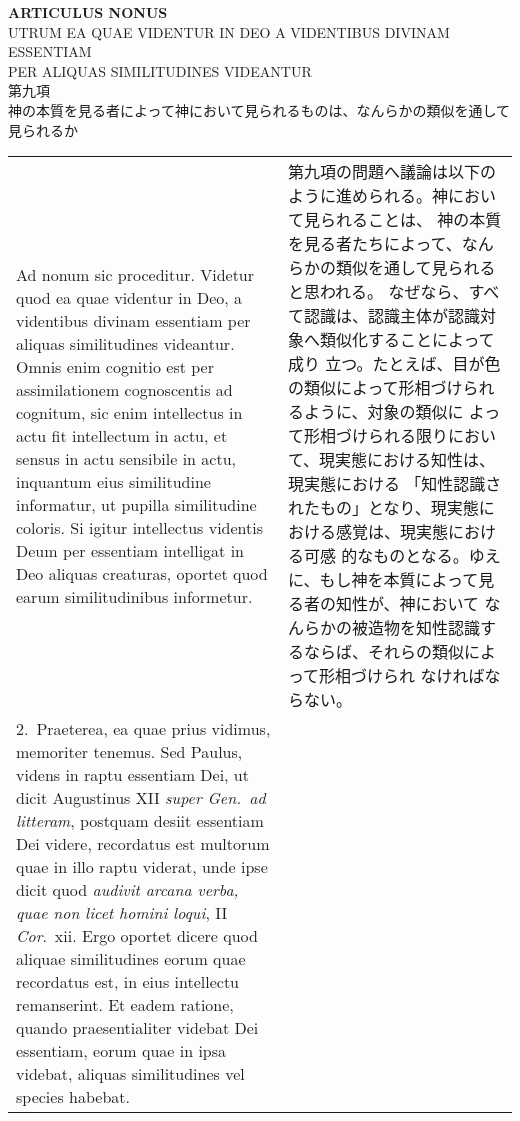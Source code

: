 \documentclass[10pt]{jsarticle} %
\begin{document}
\newpage
{}
\begin{center}
 {\Large {\bf ARTICULUS NONUS}}\\
{\large UTRUM EA QUAE VIDENTUR IN DEO A VIDENTIBUS DIVINAM ESSENTIAM\\
PER ALIQUAS SIMILITUDINES VIDEANTUR\\
第九項\\
神の本質を見る者によって神において見られるものは、なんらかの類似を通して
 見られるか}

\end{center} 


\begin{longtable}{p{21em}p{21em}}

{\sc  Ad nonum sic proceditur}. Videtur quod ea quae videntur in
 Deo, a videntibus divinam essentiam per aliquas similitudines
 videantur. Omnis enim cognitio est per assimilationem cognoscentis ad
 cognitum, sic enim intellectus in actu fit intellectum in actu, et
 sensus in actu sensibile in actu, inquantum eius similitudine
 informatur, ut pupilla similitudine coloris. Si igitur intellectus
 videntis Deum per essentiam intelligat in Deo aliquas creaturas,
 oportet quod earum similitudinibus informetur.


&

第九項の問題へ議論は以下のように進められる。神において見られることは、
神の本質を見る者たちによって、なんらかの類似を通して見られると思われる。
なぜなら、すべて認識は、認識主体が認識対象へ類似化することによって成り
立つ。たとえば、目が色の類似によって形相づけられるように、対象の類似に
よって形相づけられる限りにおいて、現実態における知性は、現実態における
「知性認識されたもの」となり、現実態における感覚は、現実態における可感
的なものとなる。ゆえに、もし神を本質によって見る者の知性が、神において
なんらかの被造物を知性認識するならば、それらの類似によって形相づけられ
なければならない。


\\


2.~{\sc  Praeterea}, ea quae prius vidimus, memoriter tenemus. Sed
 Paulus, videns in raptu essentiam Dei, ut dicit Augustinus XII {\it super
 Gen.\ ad litteram}, postquam desiit
 essentiam Dei videre, recordatus est
 multorum quae in illo raptu viderat, unde ipse dicit quod {\it audivit
 arcana verba, quae non licet homini loqui}, II {\it Cor}.\ {\sc xii}. Ergo oportet
 dicere quod aliquae similitudines eorum quae recordatus est, in eius
 intellectu remanserint. Et eadem ratione, quando praesentialiter
 videbat Dei essentiam, eorum quae in ipsa videbat, aliquas
 similitudines vel species habebat.



\end{longtable}
\end{document}
